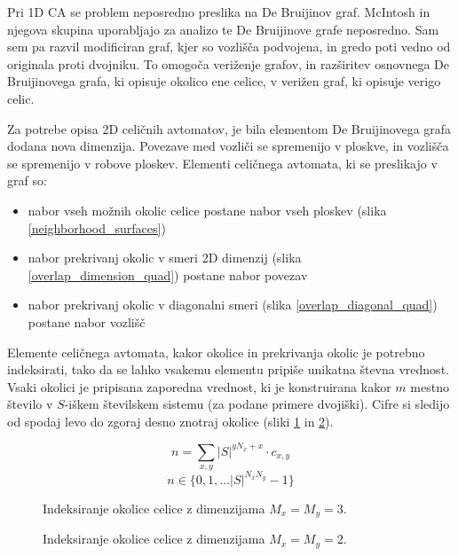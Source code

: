 \documentclass[12pt,a4paper,openany,twoside]{book}
\begin{document}
Pri 1D CA se problem neposredno preslika na De Bruijinov graf. McIntosh
in njegova skupina uporabljajo za analizo te De Bruijinove grafe neposredno. Sam sem pa
razvil modificiran graf, kjer so vozlišča podvojena, in gredo poti vedno od originala
proti dvojniku. To omogoča veriženje grafov, in razširitev osnovnega De Bruijinovega
grafa, ki opisuje okolico ene celice, v verižen graf, ki opisuje verigo celic.

Za potrebe opisa 2D celičnih avtomatov, je bila elementom
De Bruijinovega grafa dodana nova dimenzija. Povezave med vozliči se spremenijo
v ploskve, in vozlišča se spremenijo v robove ploskev.
Elementi celičnega avtomata, ki se preslikajo v graf so:
\begin{itemize}[noitemsep,nolistsep]
\item nabor vseh možnih okolic celice postane nabor vseh ploskev (slika \ref{neighborhood_surfaces})
\item nabor prekrivanj okolic v smeri 2D dimenzij (slika \ref{overlap_dimension_quad}) postane nabor povezav
\item nabor prekrivanj okolic v diagonalni smeri (slika \ref{overlap_diagonal_quad}) postane nabor vozlišč
\end{itemize}

Elemente celičnega avtomata, kakor okolice in prekrivanja okolic je potrebno indeksirati,
tako da se lahko vsakemu elementu pripiše unikatna števna vrednost.
Vsaki okolici je pripisana zaporedna vrednost, ki je konstruirana kakor \(m\) mestno število
v \(S\)-iškem številskem sistemu (za podane primere dvojiški).
Cifre si sledijo od spodaj levo do zgoraj desno znotraj okolice
(sliki \ref{neighborhood_index_moore} in \ref{neighborhood_index_quad}).

\begin{equation}
n = \sum_{x,y} |S|^{y N_x + x} \cdot c_{x,y}
\end{equation}
\begin{equation}
n \in \{0, 1, \dots |S|^{N_x N_y}-1\}
\end{equation}

\begin{figure}[htb]
\centerline{}
\caption[Indeksiranje okolice \(3 \times 3\).]{Indeksiranje okolice celice z dimenzijama \(M_x=M_y=3\).}
\label{neighborhood_index_moore}
\end{figure}

\begin{figure}[htb]
\centerline{}
\caption[Indeksiranje okolice \(2 \times 2\).]{Indeksiranje okolice celice z dimenzijama \(M_x=M_y=2\).}
\label{neighborhood_index_quad}
\end{figure}
\end{document}
